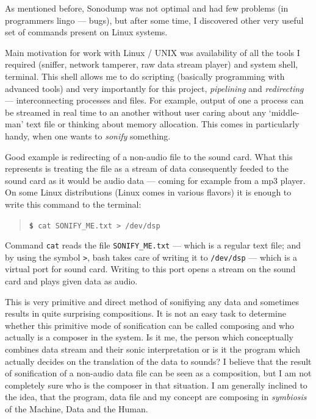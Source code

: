 \documentclass[12pt,a4paper,oneside]{report}
\begin{document}
As mentioned before, Sonodump was not optimal and had few problems (in programmers lingo --- bugs), but after some time, I discovered other very useful set of commands present on Linux systems.

Main motivation for work with Linux / UNIX was availability of all the tools I required (sniffer, network tamperer, raw data stream player) and system shell, terminal. This shell allows me to do scripting (basically programming with advanced tools) and very importantly for this project, \emph{pipelining} and \emph{redirecting} --- interconnecting processes and files. For example, output of one a process can be streamed in real time to an another without user caring about any `middle-man' text file or thinking about memory allocation. This comes in particularly handy, when one wants to \emph{sonify} something. 

Good example is redirecting of a non-audio file to the sound card. What this represents is treating the file as a stream of data consequently feeded to the sound card as it would be audio data --- coming for example from a mp3 player. On some Linux distributions (Linux comes in various flavors) it is enough to write this command to the terminal:
\begin{quotation}
	\texttt{\textbf{\$} cat SONIFY\_ME.txt > /dev/dsp} 
\end{quotation}

Command \texttt{cat} reads the file \texttt{SONIFY\_ME.txt} --- which is a regular text file; and by using the symbol \texttt{>}, bash takes care of writing it to \texttt{/dev/dsp} --- which is a virtual port for sound card. Writing to this port opens a stream on the sound card and plays given data as audio.

This is very primitive and direct method of sonifiying any data and sometimes results in quite surprising compositions. It is not an easy task to determine whether this primitive mode of sonification can be called composing and who actually is a composer in the system. Is it me, the person which conceptually combines data stream and their sonic interpretation or is it the program which actually decides on the translation of the data to sounds? I believe that the result of sonification of a non-audio data file can be seen as a composition, but I am not completely sure who is the composer in that situation. I am generally inclined to the idea, that the program, data file and my concept are composing in \emph{symbiosis} of the Machine, Data and the Human.
\end{document}
